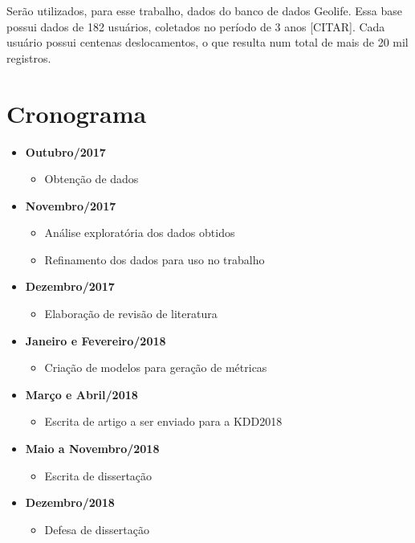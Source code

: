 \documentclass[ppgc,pep]{iiufrgs}
\begin{document}
Serão utilizados, para esse trabalho, dados do banco de dados Geolife. Essa base possui dados de 182 usuários, coletados
no período de 3 anos [CITAR]. Cada usuário possui centenas deslocamentos, o que resulta num total de mais de 20 mil registros.

\section{Cronograma}

\begin{itemize}
	\item \textbf{Outubro/2017}
	\begin{itemize}
		\item Obtenção de dados
	\end{itemize}
	\item \textbf{Novembro/2017}
	\begin{itemize}
		\item Análise exploratória dos dados obtidos
		\item Refinamento dos dados para uso no trabalho
	\end{itemize}
	\item \textbf{Dezembro/2017}
	\begin{itemize}
		\item Elaboração de revisão de literatura
	\end{itemize}
	\item \textbf{Janeiro e Fevereiro/2018}
	\begin{itemize}
		\item Criação de modelos para geração de métricas
	\end{itemize}
	\item \textbf{Março e Abril/2018}
	\begin{itemize}
		\item Escrita de artigo a ser enviado para a KDD2018
	\end{itemize}
	\item \textbf{Maio a Novembro/2018}
	\begin{itemize}
		\item Escrita de dissertação
	\end{itemize}
	\item \textbf{Dezembro/2018}
	\begin{itemize}
		\item Defesa de dissertação
	\end{itemize}
\end{itemize}
\end{document}
